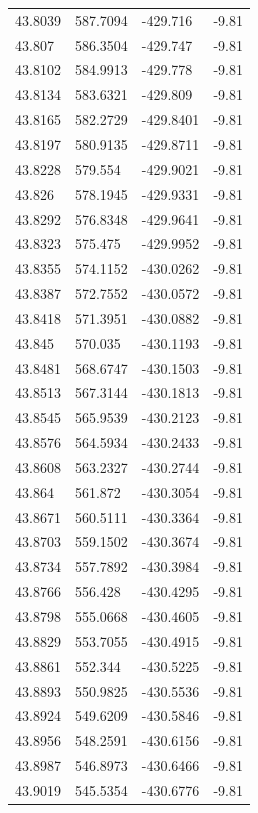 \begin{table}[H]
\begin{tabular}{llll}
43.8039 & 587.7094 & -429.716 & -9.81 \\
43.807 & 586.3504 & -429.747 & -9.81 \\
43.8102 & 584.9913 & -429.778 & -9.81 \\
43.8134 & 583.6321 & -429.809 & -9.81 \\
43.8165 & 582.2729 & -429.8401 & -9.81 \\
43.8197 & 580.9135 & -429.8711 & -9.81 \\
43.8228 & 579.554 & -429.9021 & -9.81 \\
43.826 & 578.1945 & -429.9331 & -9.81 \\
43.8292 & 576.8348 & -429.9641 & -9.81 \\
43.8323 & 575.475 & -429.9952 & -9.81 \\
43.8355 & 574.1152 & -430.0262 & -9.81 \\
43.8387 & 572.7552 & -430.0572 & -9.81 \\
43.8418 & 571.3951 & -430.0882 & -9.81 \\
43.845 & 570.035 & -430.1193 & -9.81 \\
43.8481 & 568.6747 & -430.1503 & -9.81 \\
43.8513 & 567.3144 & -430.1813 & -9.81 \\
43.8545 & 565.9539 & -430.2123 & -9.81 \\
43.8576 & 564.5934 & -430.2433 & -9.81 \\
43.8608 & 563.2327 & -430.2744 & -9.81 \\
43.864 & 561.872 & -430.3054 & -9.81 \\
43.8671 & 560.5111 & -430.3364 & -9.81 \\
43.8703 & 559.1502 & -430.3674 & -9.81 \\
43.8734 & 557.7892 & -430.3984 & -9.81 \\
43.8766 & 556.428 & -430.4295 & -9.81 \\
43.8798 & 555.0668 & -430.4605 & -9.81 \\
43.8829 & 553.7055 & -430.4915 & -9.81 \\
43.8861 & 552.344 & -430.5225 & -9.81 \\
43.8893 & 550.9825 & -430.5536 & -9.81 \\
43.8924 & 549.6209 & -430.5846 & -9.81 \\
43.8956 & 548.2591 & -430.6156 & -9.81 \\
43.8987 & 546.8973 & -430.6466 & -9.81 \\
43.9019 & 545.5354 & -430.6776 & -9.81 \\

\end{tabular}
\end{table}
